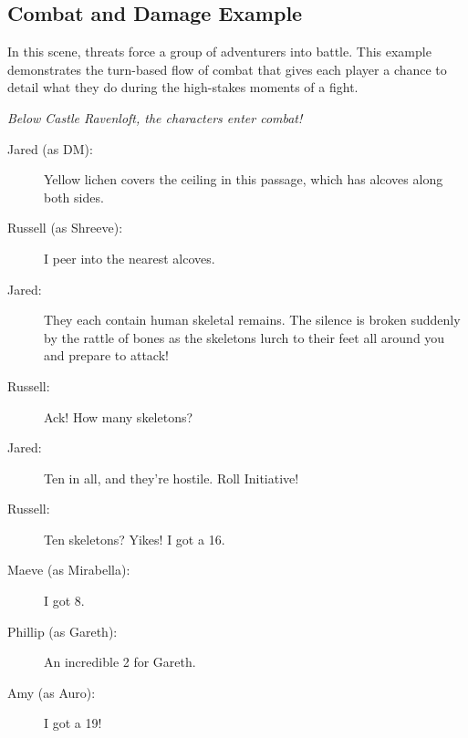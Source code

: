 \documentclass[10pt,a4paper,twoside,bg=print,twocolumn,openany,nodeprecatedcode]{dndbook}
\begin{document}
\subsection{Combat and Damage Example}
In this scene, threats force a group of adventurers into battle. This example demonstrates the turn-based flow of combat that gives each player a chance to detail what they do during the high-stakes moments of a fight.

\textit{Below Castle Ravenloft, the characters enter combat!}


\begin{description}
\item[Jared (as DM):]
Yellow lichen covers the ceiling in this passage, which has alcoves along both sides.
\item[Russell (as Shreeve):]
I peer into the nearest alcoves.
\end{description}

{\par \vspace { 9pt plus 3pt minus 3pt } \noindent  {} \nopagebreak }

\begin{description}
\item[Jared:]
They each contain human skeletal remains. The silence is broken suddenly by the rattle of bones as the skeletons lurch to their feet all around you and prepare to attack!
\end{description}


\begin{description}
\item[Russell:]
Ack! How many skeletons?
\end{description}

{\par \vspace { 9pt plus 3pt minus 3pt } \noindent  {} \nopagebreak }

\begin{description}
\item[Jared:]
Ten in all, and they're hostile. Roll Initiative!
\end{description}


\begin{description}
\item[Russell:]
Ten skeletons? Yikes! I got a 16.
\item[Maeve (as Mirabella):]
I got 8.
\item[Phillip (as Gareth):]
An incredible 2 for Gareth.
\item[Amy (as Auro):]
I got a 19!
\end{description}
\end{document}
